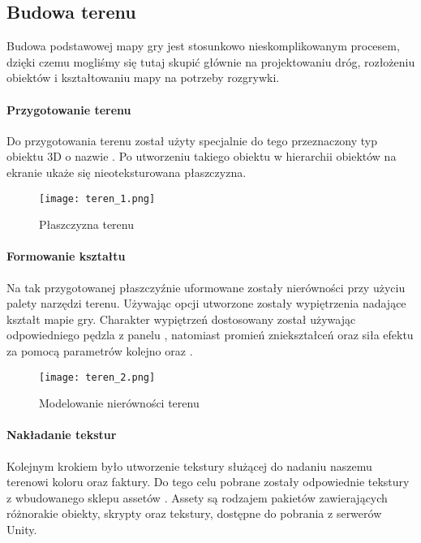 \subsection{Budowa terenu}\label{subsec:budowa_terenu}
Budowa podstawowej mapy gry jest stosunkowo nieskomplikowanym procesem, dzięki czemu mogliśmy się tutaj skupić głównie na projektowaniu dróg, rozłożeniu obiektów i kształtowaniu mapy na potrzeby rozgrywki.

\paragraph{Przygotowanie terenu}

    Do przygotowania terenu został użyty specjalnie do tego przeznaczony typ obiektu 3D o nazwie . Po utworzeniu takiego obiektu w hierarchii obiektów na ekranie ukaże się nieoteksturowana płaszczyzna.

    \begin{figure}[H]
    \texttt{[image: teren\_1.png]}
    \caption{Płaszczyzna terenu}
    \end{figure}

\paragraph{Formowanie kształtu} 

    Na tak przygotowanej płaszczyźnie uformowane zostały nierówności przy użyciu palety narzędzi terenu. Używając opcji  utworzone zostały wypiętrzenia nadające kształt mapie gry. Charakter wypiętrzeń dostosowany został używając odpowiedniego pędzla z panelu , natomiast promień zniekształceń oraz siła efektu za pomocą parametrów kolejno  oraz .

    \begin{figure}[H]
    \texttt{[image: teren\_2.png]}
    \caption{Modelowanie nierówności terenu}
    \end{figure}

\paragraph{Nakładanie tekstur}

    Kolejnym krokiem było utworzenie tekstury służącej do nadaniu naszemu terenowi koloru oraz faktury. Do tego celu pobrane zostały odpowiednie tekstury z wbudowanego sklepu assetów . Assety są rodzajem pakietów zawierających różnorakie obiekty, skrypty oraz tekstury, dostępne do pobrania z serwerów Unity.

